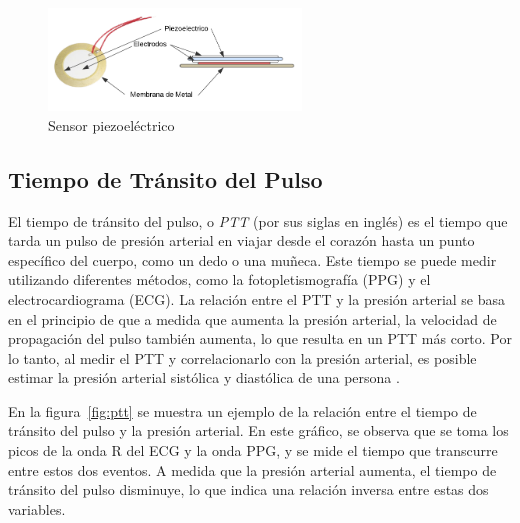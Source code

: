     \begin{figure}[H]
        \centering
        \includegraphics[width=0.6\textwidth]{img/Marco/piezoelectrico.png}
        \caption[Sensor piezoeléctrico.]{Sensor piezoeléctrico\footnotemark}
        \label{fig:sensor_piezoelectrico}
        
    \end{figure}

    \subsection{Tiempo de Tránsito del Pulso}

    El tiempo de tránsito del pulso, o \textit{PTT} (por sus siglas en inglés) es el tiempo que tarda un pulso de presión arterial en viajar desde el corazón hasta un punto específico del cuerpo, como un dedo o una muñeca. Este tiempo se puede medir utilizando diferentes métodos, como la fotopletismografía (PPG) y el electrocardiograma (ECG). La relación entre el PTT y la presión arterial se basa en el principio de que a medida que aumenta la presión arterial, la velocidad de propagación del pulso también aumenta, lo que resulta en un PTT más corto. Por lo tanto, al medir el PTT y correlacionarlo con la presión arterial, es posible estimar la presión arterial sistólica y diastólica de una persona \cite{NOX_medical}.

    En la figura~\ref{fig:ptt} se muestra un ejemplo de la relación entre el tiempo de tránsito del pulso y la presión arterial. En este gráfico, se observa que se toma los picos de la onda R del ECG y la onda PPG, y se mide el tiempo que transcurre entre estos dos eventos. A medida que la presión arterial aumenta, el tiempo de tránsito del pulso disminuye, lo que indica una relación inversa entre estas dos variables.


